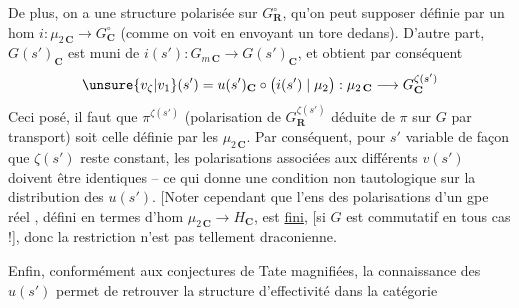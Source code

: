 De plus, on a une structure polarisée\inserted{ $\pi$} sur $G_{\mathbf R}^{\circ}$, qu'on peut  supposer définie par un hom  $i:\mu_{2\,\mathbf C}\longrightarrow G_{\mathbf C}^{\circ}$ (comme on voit en envoyant un tore  dedans). D'autre part, $G(s')_{\mathbf C}$ est muni de $i(s'):G_{m\,\mathbf C}\to G(s')_{\mathbf C}$, et  obtient par conséquent
\[
\unsure{v_{\zeta}|v_1}(s')=u(s')_{\mathbf C}\circ\bigl(i(s')\mid\mu_2\bigr):\mu_{2\,\mathbf C}\longrightarrow G_{\mathbf C}^{\zeta(s')}
\]
 Ceci posé, il faut que $\pi^{\zeta(s')}$ (polarisation de $G_{\mathbf R}^{\zeta(s')}$ déduite de $\pi$ sur $G$ par transport) soit celle définie par les $\mu_{2\,\mathbf C}$. Par conséquent, pour $s'$ variable de façon que $\zeta(s')$ reste constant, les polarisations  associées aux différents $v(s')$ doivent être identiques -- ce qui donne une condition non tautologique sur la distribution des  $u(s')$. [Noter cependant que l'ens des  polarisations d'un gpe réel , défini en termes d'hom $\mu_{2\,\mathbf C}\to H_{\mathbf C}$,  est \uline{fini}, [si $G$ est commutatif en tous cas !], donc la restriction n'est pas tellement draconienne.

Enfin, conformément aux conjectures de Tate magnifiées, la connaissance des $u(s')$ permet de retrouver la structure d'effectivité dans la catégorie
